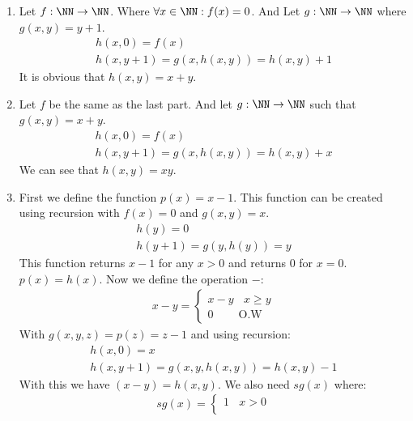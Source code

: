 \begin{enumerate}[label=\textbf{(\textit{\roman*})}]
    \item 
        Let $f:\NN \to \NN$. Where $\forall x \in \NN: f(x) = 0$.
        And Let $g: \NN \to \NN$ where $g(x, y) = y + 1$.
        \begin{gather*}
            h(x, 0) = f(x) \\
            h(x, y + 1) = g(x, h(x, y)) = h(x, y) + 1
        \end{gather*}
        It is obvious that $h(x, y) = x + y$.
        \newpage
    \item 
        Let $f$ be the same as the last part. And let $g: \NN \to \NN$ such that $g(x, y) = x + y$.
        \begin{gather*}
            h(x, 0) = f(x) \\
            h(x, y + 1) = g(x, h(x, y)) = h(x, y) + x
        \end{gather*}
        We can see that $h(x, y) = xy$.
    \item  
        First we define the function $p(x) = x-1$. This function can be created using recursion with $f(x) = 0$ and $g(x, y) = x$.
        \begin{gather*}
            h(y) = 0 \\
            h(y + 1) = g(y, h(y)) = y
        \end{gather*}
        This function returns $x - 1$ for any $x > 0$ and returns $0$ for $x = 0$. $p(x) = h(x)$. \newline
        Now we define the operation $-$:
        \begin{gather*}
            x - y = \begin{cases}
                x - y \ \ \ \ x \ge y\\
                0 \ \ \ \ \ \ \ \ \ \  \text{O.W}
            \end{cases}
        \end{gather*}
        With $g(x, y, z) = p(z) = z - 1$ and using recursion:
        \begin{gather*}
            h(x, 0) = x \\
            h(x, y + 1) = g(x, y, h(x, y)) = h(x, y) - 1
        \end{gather*}
        With this we have $(x - y) = h(x, y)$. \newline
        We also need $sg(x)$ where:
        \begin{gather*}
            sg(x) = \begin{cases}
                1 \ \ \ \ x > 0 \\

\end{cases}
\end{gather*}
\end{enumerate}
